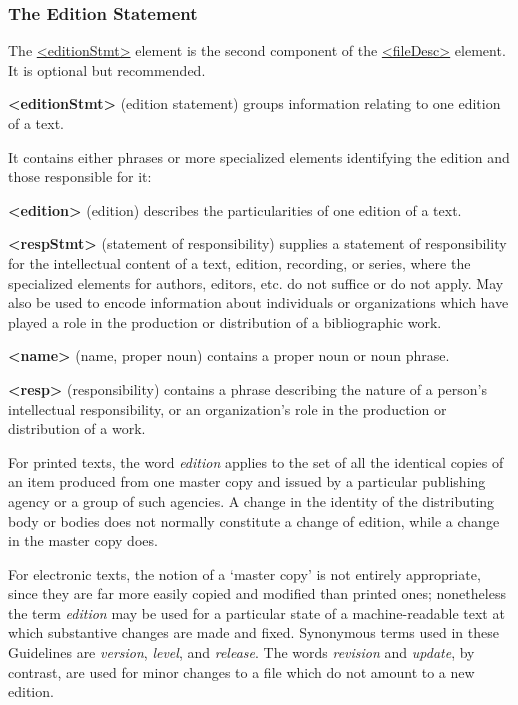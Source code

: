 \subsubsection[{The Edition Statement}]{The Edition Statement}\label{HD22}\par
The \hyperref[TEI.editionStmt]{<editionStmt>} element is the second component of the \hyperref[TEI.fileDesc]{<fileDesc>} element. It is optional but recommended. 
\begin{sansreflist}
  
\item [\textbf{<editionStmt>}] (edition statement) groups information relating to one edition of a text.
\end{sansreflist}
 It contains either phrases or more specialized elements identifying the edition and those responsible for it: 
\begin{sansreflist}
  
\item [\textbf{<edition>}] (edition) describes the particularities of one edition of a text.
\item [\textbf{<respStmt>}] (statement of responsibility) supplies a statement of responsibility for the intellectual content of a text, edition, recording, or series, where the specialized elements for authors, editors, etc. do not suffice or do not apply. May also be used to encode information about individuals or organizations which have played a role in the production or distribution of a bibliographic work.
\item [\textbf{<name>}] (name, proper noun) contains a proper noun or noun phrase.
\item [\textbf{<resp>}] (responsibility) contains a phrase describing the nature of a person's intellectual responsibility, or an organization's role in the production or distribution of a work.
\end{sansreflist}
\par
For printed texts, the word \textit{edition} applies to the set of all the identical copies of an item produced from one master copy and issued by a particular publishing agency or a group of such agencies. A change in the identity of the distributing body or bodies does not normally constitute a change of edition, while a change in the master copy does.\par
For electronic texts, the notion of a ‘master copy’ is not entirely appropriate, since they are far more easily copied and modified than printed ones; nonetheless the term \textit{edition} may be used for a particular state of a machine-readable text at which substantive changes are made and fixed. Synonymous terms used in these Guidelines are \textit{version}, \textit{level}, and \textit{release}. The words \textit{revision} and \textit{update}, by contrast, are used for minor changes to a file which do not amount to a new edition.\par
